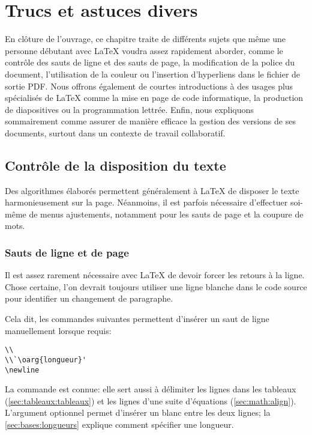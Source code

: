 
\chapter{Trucs et astuces divers}
\label{chap:trucs}

En clôture de l'ouvrage, ce chapitre traite de différents sujets que
même une personne débutant avec {\LaTeX} voudra assez rapidement
aborder, comme le contrôle des sauts de ligne et des sauts de page, la
modification de la police du document, l'utilisation de la couleur ou
l'insertion d'hyperliens dans le fichier de sortie PDF. Nous offrons
également de courtes introductions à des usages plus spécialisés de
{\LaTeX} comme la mise en page de code informatique, la production de
diapositives ou la programmation lettrée. Enfin, nous expliquons
sommairement comme assurer de manière efficace la gestion des versions
de ses documents, surtout dans un contexte de travail collaboratif.

\section{Contrôle de la disposition du texte}
\label{sec:trucs:controle}

Des algorithmes élaborés permettent généralement à {\LaTeX} de
disposer le texte harmonieusement sur la page. Néanmoins, il
est parfois nécessaire  d'effectuer soi-même de menus ajustements,
notamment pour les sauts de page et la coupure de mots.

\subsection{Sauts de ligne et de page}
\label{sec:trucs:controle:sauts}

Il est assez rarement nécessaire avec {\LaTeX} de devoir forcer les
retours à la ligne. Chose certaine, l'on devrait toujours utiliser une
ligne blanche dans le code source pour identifier un changement de
paragraphe.

Cela dit, les commandes suivantes permettent d'insérer un saut de
ligne manuellement lorsque requis:
\begin{lstlisting}
\\
\\`\oarg{longueur}'
\newline
\end{lstlisting}
La commande {\pixbsbs} est connue: elle sert aussi à délimiter les
lignes dans les tableaux (\autoref{sec:tableaux:tableaux}) et les lignes
d'une suite d'équations (\autoref{sec:math:align}). L'argument optionnel
 permet d'insérer un blanc entre les deux lignes; la
\autoref{sec:bases:longueurs} explique comment spécifier une
longueur.

